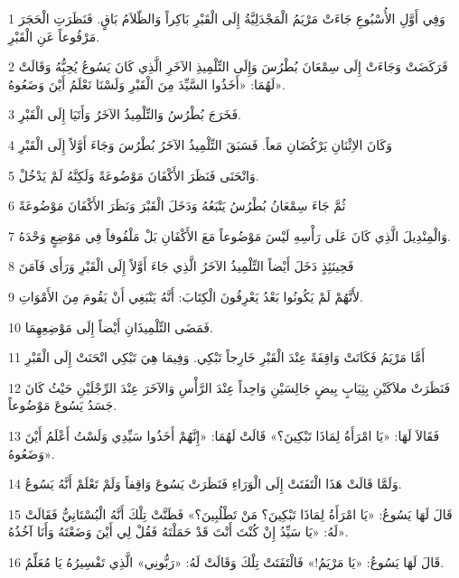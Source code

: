 \par 1 ٍوَفِي أَوَّلِ الأُسْبُوعِ جَاءَتْ مَرْيَمُ الْمَجْدَلِيَّةُ إِلَى الْقَبْرِ بَاكِراً وَالظّلاَمُ بَاقٍ. فَنَظَرَتِ الْحَجَرَ مَرْفُوعاً عَنِ الْقَبْرِ.
\par 2 فَرَكَضَتْ وَجَاءَتْ إِلَى سِمْعَانَ بُطْرُسَ وَإِلَى التِّلْمِيذِ الآخَرِ الَّذِي كَانَ يَسُوعُ يُحِبُّهُ وَقَالَتْ لَهُمَا: «أَخَذُوا السَّيِّدَ مِنَ الْقَبْرِ وَلَسْنَا نَعْلَمُ أَيْنَ وَضَعُوهُ».
\par 3 فَخَرَجَ بُطْرُسُ وَالتِّلْمِيذُ الآخَرُ وَأَتَيَا إِلَى الْقَبْرِ.
\par 4 وَكَانَ الاِثْنَانِ يَرْكُضَانِ مَعاً. فَسَبَقَ التِّلْمِيذُ الآخَرُ بُطْرُسَ وَجَاءَ أَوَّلاً إِلَى الْقَبْرِ
\par 5 وَانْحَنَى فَنَظَرَ الأَكْفَانَ مَوْضُوعَةً وَلَكِنَّهُ لَمْ يَدْخُلْ.
\par 6 ثُمَّ جَاءَ سِمْعَانُ بُطْرُسُ يَتْبَعُهُ وَدَخَلَ الْقَبْرَ وَنَظَرَ الأَكْفَانَ مَوْضُوعَةً
\par 7 وَالْمِنْدِيلَ الَّذِي كَانَ عَلَى رَأْسِهِ لَيْسَ مَوْضُوعاً مَعَ الأَكْفَانِ بَلْ مَلْفُوفاً فِي مَوْضِعٍ وَحْدَهُ.
\par 8 فَحِينَئِذٍ دَخَلَ أَيْضاً التِّلْمِيذُ الآخَرُ الَّذِي جَاءَ أَوَّلاً إِلَى الْقَبْرِ وَرَأَى فَآمَنَ
\par 9 لأَنَّهُمْ لَمْ يَكُونُوا بَعْدُ يَعْرِفُونَ الْكِتَابَ: أَنَّهُ يَنْبَغِي أَنْ يَقُومَ مِنَ الأَمْوَاتِ.
\par 10 فَمَضَى التِّلْمِيذَانِ أَيْضاً إِلَى مَوْضِعِهِمَا.
\par 11 أَمَّا مَرْيَمُ فَكَانَتْ وَاقِفَةً عِنْدَ الْقَبْرِ خَارِجاً تَبْكِي. وَفِيمَا هِيَ تَبْكِي انْحَنَتْ إِلَى الْقَبْرِ
\par 12 فَنَظَرَتْ ملاَكَيْنِ بِثِيَابٍ بِيضٍ جَالِسَيْنِ وَاحِداً عِنْدَ الرَّأْسِ وَالآخَرَ عِنْدَ الرِّجْلَيْنِ حَيْثُ كَانَ جَسَدُ يَسُوعَ مَوْضُوعاً.
\par 13 فَقَالاَ لَهَا: «يَا امْرَأَةُ لِمَاذَا تَبْكِينَ؟» قَالَتْ لَهُمَا: «إِنَّهُمْ أَخَذُوا سَيِّدِي وَلَسْتُ أَعْلَمُ أَيْنَ وَضَعُوهُ».
\par 14 وَلَمَّا قَالَتْ هَذَا الْتَفَتَتْ إِلَى الْوَرَاءِ فَنَظَرَتْ يَسُوعَ وَاقِفاً وَلَمْ تَعْلَمْ أَنَّهُ يَسُوعُ.
\par 15 قَالَ لَهَا يَسُوعُ: «يَا امْرَأَةُ لِمَاذَا تَبْكِينَ؟ مَنْ تَطْلُبِينَ؟» فَظَنَّتْ تِلْكَ أَنَّهُ الْبُسْتَانِيُّ فَقَالَتْ لَهُ: «يَا سَيِّدُ إِنْ كُنْتَ أَنْتَ قَدْ حَمَلْتَهُ فَقُلْ لِي أَيْنَ وَضَعْتَهُ وَأَنَا آخُذُهُ».
\par 16 قَالَ لَهَا يَسُوعُ: «يَا مَرْيَمُ!» فَالْتَفَتَتْ تِلْكَ وَقَالَتْ لَهُ: «رَبُّونِي» الَّذِي تَفْسِيرُهُ يَا مُعَلِّمُ.
